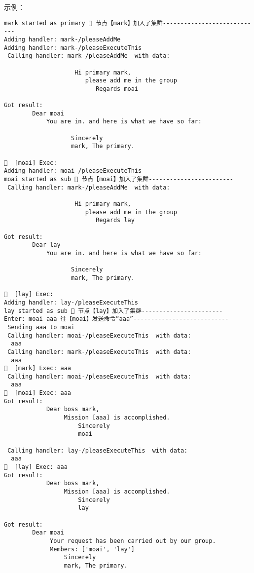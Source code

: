 示例：
\begin{tcolorbox}[breakable]
  
\begin{verbatim}
mark started as primary 🐸 节点【mark】加入了集群----------------------------
Adding handler: mark-/pleaseAddMe
Adding handler: mark-/pleaseExecuteThis
 Calling handler: mark-/pleaseAddMe  with data:
  
                    Hi primary mark,
                       please add me in the group
                          Regards moai
                     
Got result: 
        Dear moai
            You are in. and here is what we have so far:
            
                   Sincerely
                   mark, The primary.
         
🦜  [moai] Exec:              
Adding handler: moai-/pleaseExecuteThis
moai started as sub 🐸 节点【moai】加入了集群------------------------
 Calling handler: mark-/pleaseAddMe  with data:
  
                    Hi primary mark,
                       please add me in the group
                          Regards lay
                     
Got result: 
        Dear lay
            You are in. and here is what we have so far:
            
                   Sincerely
                   mark, The primary.
         
🦜  [lay] Exec:              
Adding handler: lay-/pleaseExecuteThis
lay started as sub 🐸 节点【lay】加入了集群-----------------------
Enter: moai aaa 往【moai】发送命令“aaa”---------------------------
 Sending aaa to moai 
 Calling handler: moai-/pleaseExecuteThis  with data:
  aaa 
 Calling handler: mark-/pleaseExecuteThis  with data:
  aaa 
🦜  [mark] Exec: aaa 
 Calling handler: moai-/pleaseExecuteThis  with data:
  aaa 
🦜  [moai] Exec: aaa 
Got result: 
            Dear boss mark,
                 Mission [aaa] is accomplished.
                     Sincerely
                     moai
             
 Calling handler: lay-/pleaseExecuteThis  with data:
  aaa 
🦜  [lay] Exec: aaa 
Got result: 
            Dear boss mark,
                 Mission [aaa] is accomplished.
                     Sincerely
                     lay
             
Got result: 
        Dear moai
             Your request has been carried out by our group.
             Members: ['moai', 'lay']
                 Sincerely
                 mark, The primary.
         

\end{verbatim}
\end{tcolorbox}
